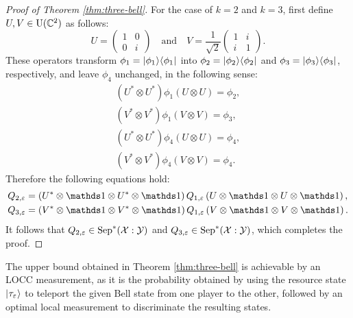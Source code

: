 \begin{proof}[Proof of Theorem \ref{thm:three-bell}]
  For the case of $k=2$ and $k = 3$, first define 
  $U, V \in \mathrm{U}(\mathbb{C}^{2})$ as follows:
  \begin{equation}
    U = \begin{pmatrix}
      1 & 0\\
      0 & i
    \end{pmatrix}
    \quad \mbox{and} \quad
    V = \frac{1}{\sqrt{2}}\begin{pmatrix}
      1 & i\\
      i & 1
    \end{pmatrix}.
  \end{equation}
  These operators transform $\phi_{1} = \lvert\mspace{0.5mu} \phi_1 \mspace{0.5mu} \rangle\langle\mspace{0.5mu} \phi_1 \mspace{0.5mu} \rvert$ into 
  $\phi_{2} = \lvert\mspace{0.5mu} \phi_2 \mspace{0.5mu} \rangle\langle\mspace{0.5mu} \phi_2 \mspace{0.5mu} \rvert$ and $\phi_{3} =
  \lvert\mspace{0.5mu} \phi_3 \mspace{0.5mu} \rangle\langle\mspace{0.5mu} \phi_3 \mspace{0.5mu} \rvert$, respectively, and leave $\phi_{4}$ unchanged, in
  the following sense:
  \begin{equation}
    \begin{aligned}
      (U^{\ast}\otimes U^{\ast}) \phi_{1} (U\otimes U) = \phi_{2},\\
      (V^{\ast}\otimes V^{\ast}) \phi_{1} (V\otimes V) = \phi_{3},\\
      (U^{\ast}\otimes U^{\ast}) \phi_{4} (U\otimes U) = \phi_{4},\\
      (V^{\ast}\otimes V^{\ast}) \phi_{4} (V\otimes V) = \phi_{4}.
    \end{aligned}
  \end{equation}
  Therefore the following equations hold:
  \begin{equation}
    \begin{aligned}
      Q_{2,\eps} &= \left(U^{\ast}\otimes\I \otimes U^{\ast}\otimes\I\right) 
      Q_{1,\eps} \left(U\otimes\I \otimes U\otimes\I\right),  \\
      Q_{3,\eps} &= \left(V^{\ast}\otimes\I \otimes V^{\ast}\otimes\I\right) 
      Q_{1,\eps} \left(V\otimes\I \otimes V\otimes\I\right).
    \end{aligned}
  \end{equation}
  It follows that $Q_{2,\varepsilon}\in\mathrm{Sep}^{\ast}(\mathcal{X}:\mathcal{Y})$ and $Q_{3,\varepsilon}\in\mathrm{Sep}^{\ast}(\mathcal{X}:\mathcal{Y})$,
  which completes the proof.
\end{proof}

\begin{remark}
  The upper bound obtained in Theorem \ref{thm:three-bell} is achievable by an
  LOCC measurement, as it is the probability obtained by using the resource
  state $\lvert\mspace{0.5mu} \tau_\varepsilon \mspace{0.5mu} \rangle$ to teleport the given Bell state from one
  player to the other, followed by an optimal local measurement to discriminate
  the resulting states.
\end{remark}

